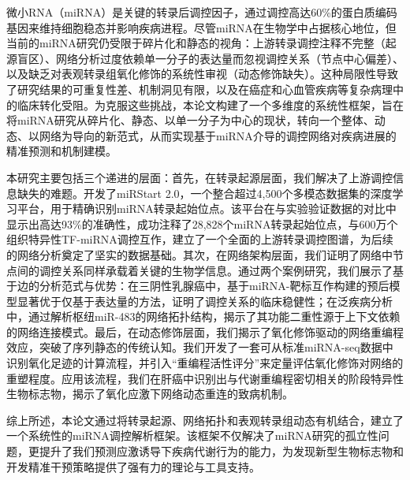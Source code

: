 
微小RNA（miRNA）是关键的转录后调控因子，通过调控高达60\%的蛋白质编码基因来维持细胞稳态并影响疾病进程。尽管miRNA在生物学中占据核心地位，但当前的miRNA研究仍受限于碎片化和静态的视角：上游转录调控注释不完整（起源盲区）、网络分析过度依赖单一分子的表达量而忽视调控关系（节点中心偏差）、以及缺乏对表观转录组氧化修饰的系统性审视（动态修饰缺失）。这种局限性导致了研究结果的可重复性差、机制洞见有限，以及在癌症和心血管疾病等复杂病理中的临床转化受阻。为克服这些挑战，本论文构建了一个多维度的系统性框架，旨在将miRNA研究从碎片化、静态、以单一分子为中心的现状，转向一个整体、动态、以网络为导向的新范式，从而实现基于miRNA介导的调控网络对疾病进展的精准预测和机制建模。

本研究主要包括三个递进的层面：首先，在转录起源层面，我们解决了上游调控信息缺失的难题。开发了miRStart 2.0，一个整合超过4,500个多模态数据集的深度学习平台，用于精确识别miRNA转录起始位点。该平台在与实验验证数据的对比中显示出高达93\%的准确性，成功注释了28,828个miRNA转录起始位点，与600万个组织特异性TF-miRNA调控互作，建立了一个全面的上游转录调控图谱，为后续的网络分析奠定了坚实的数据基础。其次，在网络架构层面，我们证明了网络中节点间的调控关系同样承载着关键的生物学信息。通过两个案例研究，我们展示了基于边的分析范式与优势：在三阴性乳腺癌中，基于miRNA-靶标互作构建的预后模型显著优于仅基于表达量的方法，证明了调控关系的临床稳健性；在泛疾病分析中，通过解析枢纽miR-483的网络拓扑结构，揭示了其功能二重性源于上下文依赖的网络连接模式。最后，在动态修饰层面，我们揭示了氧化修饰驱动的网络重编程效应，突破了序列静态的传统认知。我们开发了一套可从标准miRNA-seq数据中识别氧化足迹的计算流程，并引入``重编程活性评分''来定量评估氧化修饰对网络的重塑程度。应用该流程，我们在肝癌中识别出与代谢重编程密切相关的阶段特异性生物标志物，揭示了氧化应激下网络动态重连的致病机制。

综上所述，本论文通过将转录起源、网络拓扑和表观转录组动态有机结合，建立了一个系统性的miRNA调控解析框架。该框架不仅解决了miRNA研究的孤立性问题，更提升了我们预测应激诱导下疾病代谢行为的能力，为发现新型生物标志物和开发精准干预策略提供了强有力的理论与工具支持。
